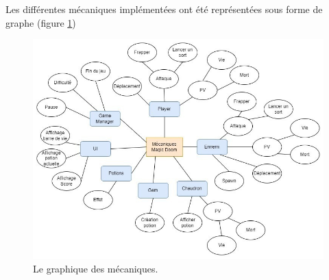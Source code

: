 Les différentes mécaniques implémentées ont été représentées sous forme de graphe (figure \ref{fig:mecanique})

\FloatBarrier
\begin{figure}[!ht]
    \includegraphics[width=\textwidth]{image/mecaniques.jpeg}
    \caption{Le graphique des mécaniques.}
    \label{fig:mecanique}
\end{figure}